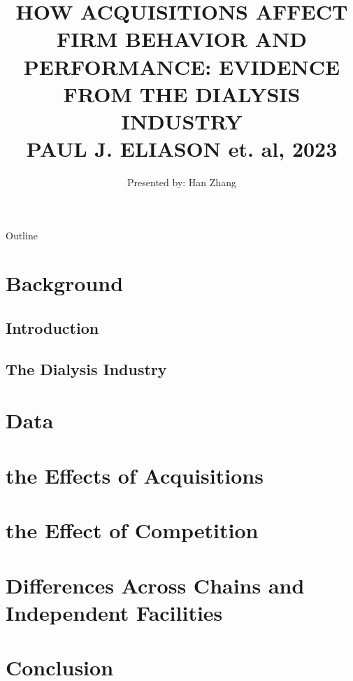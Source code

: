 \documentclass[hyperref={colorlinks,citecolor=blue,linkcolor=blue,urlcolor=blue}]{beamer}
\title[]{HOW ACQUISITIONS AFFECT FIRM BEHAVIOR AND PERFORMANCE: EVIDENCE FROM THE DIALYSIS INDUSTRY \\ 
PAUL J. ELIASON et. al, 2023}
\author{Presented by: Han Zhang}
\institute{UT Austin}
\date{}
\begin{document}
\begin{frame}
  \titlepage
\end{frame}

\begin{frame}{Outline}
  \tableofcontents
\end{frame}

\section{Background}
\subsection{Introduction}


\subsection{The Dialysis Industry}





\section{Data}






\section{the Effects of Acquisitions}









\section{the Effect of Competition}





\section{Differences Across Chains and Independent Facilities}




\section{Conclusion}


\end{document}
